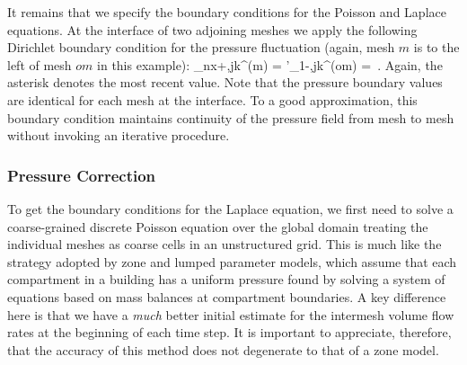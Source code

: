 \documentclass[11pt]{book}
\begin{document}
It remains that we specify the boundary conditions for the Poisson and Laplace equations.  At the interface of two adjoining meshes we apply the following Dirichlet boundary condition for the pressure fluctuation (again, mesh $m$ is to the left of mesh $om$ in this example):
_{nx+\ha,jk}^{(m)} = {\cH'}_{1-\ha,jk}^{(om)} = \left[ {\cH'}_{nx,jk}^{(m),*} + {\cH'}_{1,jk}^{(om),*} \right] \,\mbox{.} \ee
Again, the asterisk denotes the most recent value.  Note that the pressure boundary values are identical for each mesh at the interface.  To a good approximation, this boundary condition maintains continuity of the pressure field from mesh to mesh without invoking an iterative procedure.

\subsubsection{Pressure Correction}

To get the boundary conditions for the Laplace equation, we first need to solve a coarse-grained discrete Poisson equation over the global domain treating the individual meshes as coarse cells in an unstructured grid. This is much like the strategy adopted by zone and lumped parameter models, which assume that each compartment in a building has a uniform pressure found by solving a system of equations based on mass balances at compartment boundaries.  A key difference here is that we have a \emph{much} better initial estimate for the intermesh volume flow rates at the beginning of each time step. It is important to appreciate, therefore, that the accuracy of this method does not degenerate to that of a zone model.
\end{document}
